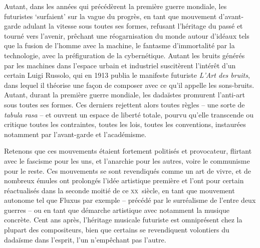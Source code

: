 \documentclass{article}
\begin{document}
Autant, dans les années qui précédèrent la première guerre mondiale, les futuristes `surfaient' sur la vague du progrès, en tant que mouvement d'avant-garde adulant la vitesse sous toutes ses formes, refusant l'héritage du passé et tourné vers l'avenir, prêchant une réogarnisation du monde autour d'idéaux tels que la fusion de l’homme avec la machine, le fantasme d'immortalité par la technologie, avec la préfiguration de la cybernétique. Autant les bruits générés par les machines dans l'espace urbain et industriel suscitèrent l'intérêt d'un certain Luigi Russolo, qui en 1913 publia le manifeste futuriste \textit{L'Art des bruits}, %
dans lequel il théorise une façon de composer avec ce qu'il appelle les sons-bruits. 
Autant, durant la première guerre mondiale, les dadaïstes promurent l'anti-art sous toutes ses formes. Ces derniers rejettent alors toutes règles -- une sorte de \textit{tabula rasa} -- et ouvrent un espace de liberté totale, pourvu qu'elle transcende ou critique toutes les contraintes, toutes les lois, toutes les conventions, instaurées notamment par l'avant-garde et l'académisme. 


Retenons que ces mouvements étaient fortement politisés et provocateur, flirtant avec le fascisme pour les uns, et l'anarchie pour les autres, voire le communisme pour le reste. %
Ces mouvements se sont revendiqués comme un art de vivre, et de nombreux émules ont prolongés l'idée artistique première et l'ont pour certain réactualisés dans la seconde moitié de ce \textsc{xx}\ieme ~siècle, en tant que mouvement autonome tel que Fluxus par exemple -- précédé par le surréalisme de l'entre deux guerres -- ou en tant que démarche artistique avec notamment la musique concrète. Cent ans après, l'héritage musicale futuriste est omniprésent chez la plupart des compositeurs, bien que certains se revendiquent volontiers du dadaïsme dans l'esprit, l'un n'empêchant pas l'autre. 


\end{document}
